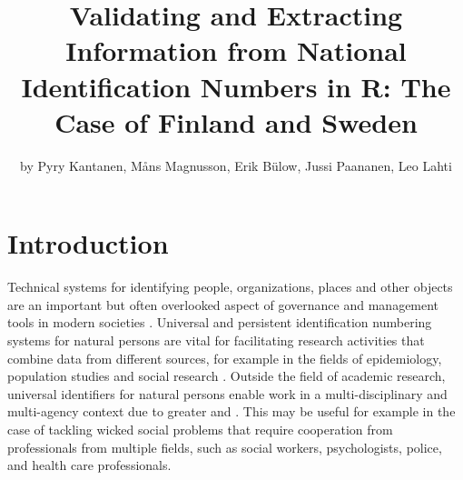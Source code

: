 \title{Validating and Extracting Information from National Identification Numbers in R: The Case of Finland and Sweden}
\author{by Pyry Kantanen, Måns Magnusson, Erik Bülow, Jussi Paananen, Leo Lahti}

\maketitle


\section{Introduction}

Technical systems for identifying people, organizations, places and other objects are an important but often overlooked aspect of governance and management tools in modern societies \citep{dodge2005}. Universal and persistent identification numbering systems for natural persons are vital for facilitating research activities that combine data from different sources, for example in the fields of epidemiology, population studies and social research \citep{gissler2004}. Outside the field of academic research, universal identifiers for natural persons enable work in a multi-disciplinary and multi-agency context due to greater  and  \citep{alastalo2022}. This may be useful for example in the case of tackling wicked social problems that require cooperation from professionals from multiple fields, such as social workers, psychologists, police, and health care professionals.

